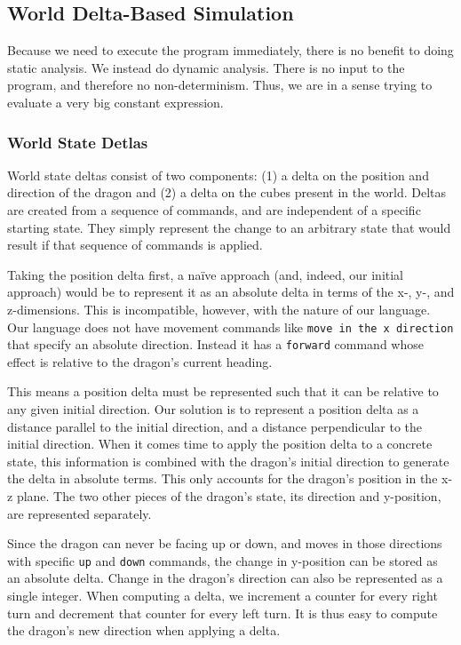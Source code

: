 \documentclass{sig-alternate}
\begin{document}
\subsection{World Delta-Based Simulation}
Because we need to execute the program immediately, there is no benefit to doing static analysis. We instead do dynamic analysis. There is no input to the program, and therefore no non-determinism. Thus, we are in a sense trying to evaluate a very big constant expression.

\subsubsection{World State Detlas}

World state deltas consist of two components: (1) a delta on the position and direction of the dragon and (2) a delta on the cubes present in the world. Deltas are created from a sequence of commands, and are independent of a specific starting state. They simply represent the change to an arbitrary state that would result if that sequence of commands is applied. 

Taking the position delta first, a na\"{i}ve approach (and, indeed, our initial approach) would be to represent it as an absolute delta in terms of the x-, y-, and z-dimensions. This is incompatible, however, with the nature of our language. Our language does not have movement commands like \texttt{move in the x direction} that specify an absolute direction. Instead it has a \texttt{forward} command whose effect is relative to the dragon's current heading. 

This means a position delta must be represented such that it can be relative to any given initial direction. Our solution is to represent a position delta as a distance parallel to the initial direction, and a distance perpendicular to the initial direction. When it comes time to apply the position delta to a concrete state, this information is combined with the dragon's initial direction to generate the delta in absolute terms. This only accounts for the dragon's position in the x-z plane. The two other pieces of the dragon's state, its direction and y-position, are represented separately. 

Since the dragon can never be facing up or down, and moves in those directions with specific \texttt{up} and \texttt{down} commands, the change in y-position can be stored as an absolute delta. Change in the dragon's direction can also be represented as a single integer. When computing a delta, we increment a counter for every right turn and decrement that counter for every left turn. It is thus easy to compute the dragon's new direction when applying a delta.
\end{document}
